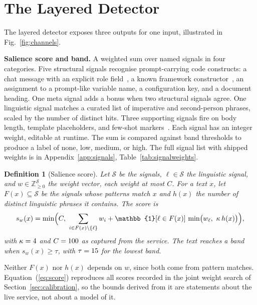 \documentclass[conference]{IEEEtran}
\newtheorem{definition}{Definition}
\begin{document}
\section{The Layered Detector}\label{sec:system}


The layered detector exposes three outputs for one input, illustrated in
Fig.~\ref{fig:channels}.

\textbf{Salience score and band.} A weighted sum over \NSignalsTotal{} named
signals in four categories. Five structural signals recognise prompt-carrying
code constructs: a chat message with an explicit role
field~\cite{ouyang2022training}, a known framework
constructor~\cite{rebedea2023nemo}, an assignment to a prompt-like variable
name, a configuration key, and a document heading. One meta signal adds a bonus when two structural
signals agree. One linguistic signal matches a curated list of imperative and
second-person phrases, scaled by the number of distinct hits. Three supporting
signals fire on body length, template placeholders, and few-shot
markers~\cite{brown2020language}. Each
signal has an integer weight, editable at runtime. The sum is compared against
band thresholds to produce a label of none, low, medium, or high. The full
signal list with shipped weights is in Appendix~\ref{app:signals},
Table~\ref{tab:signalweights}.

\begin{definition}[Salience score]\label{def:score}
Let $\mathcal{S}$ be the \NSignalsTotal{} signals, $\ell \in \mathcal{S}$ the
linguistic signal, and $w \in \mathbb{Z}_{\ge 0}^{\mathcal{S}}$ the weight
vector, each weight at most $C$. For a text $x$, let $F(x) \subseteq
\mathcal{S}$ be the signals whose patterns match $x$ and $h(x)$ the number of
distinct linguistic phrases it contains. The score is
\begin{equation}\label{eq:score}
s_w(x) = \min\Bigl(C,\ \sum_{i \in F(x)\setminus\{\ell\}} w_i
  + \mathbb{1}[\ell \in F(x)]\,\min\bigl(w_\ell,\ \kappa\,h(x)\bigr)\Bigr),
\end{equation}
with $\kappa = 4{}$ and $C = 100{}$ as captured from
the service. The text reaches a band when $s_w(x) \ge \tau$, with
$\tau = 15{}$ for the lowest band.
\end{definition}

Neither $F(x)$ nor $h(x)$ depends on $w$, since both come from pattern
matches. Equation~(\ref{eq:score}) reproduces all \NScoreModelCells{} scores
recorded in the joint weight search of Section~\ref{sec:calibration}, so the
bounds derived from it are statements about the live service, not about a
model of it.
\end{document}

